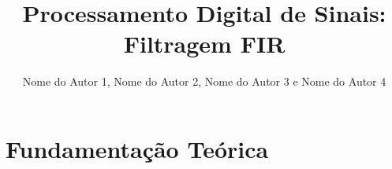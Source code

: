 \documentclass[conference]{IEEEtran}
\begin{document}
\title{Processamento Digital de Sinais: Filtragem FIR}

\author{Nome do Autor 1, Nome do Autor 2, Nome do Autor 3 e Nome do Autor 4}

\maketitle

\section{Fundamentação Teórica}


%
%
\end{document}
